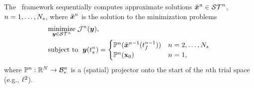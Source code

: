 The \methodAcronym\ framework sequentially computes approximate solutions
$\tilde{\boldsymbol x}^{n}\in\mathcal{ ST }^n$, $n=1,\ldots,N_s$, where 
$\tilde{\boldsymbol x}^{n}$ is the solution to the
minimization problems
\begin{equation}\label{eq:tclsrm}
\begin{split}
      &\underset{\boldsymbol y \in \mathcal{ ST }^n}{\text{minimize}} \; \mathcal{J}^n(\boldsymbol y), \\
			&\text{subject to } \;  \boldsymbol y(t_s^{n}) =
\begin{cases}\mathbb{P}^n (\tilde{\boldsymbol x}^{n-1}(t_f^{n-1})) & n = 2,\ldots,N_s \\
\mathbb{P}^n( {{\mathbf{x}}_0})& n=1, \end{cases} 
\end{split}
\end{equation}
where $\mathbb{P}^{n} : \mathbb{R}^{N} \rightarrow \mathcal{B}_{s}^{n}$ 
is a (spatial) projector onto the start of the $n$th trial space (e.g., $\ell^2$).

